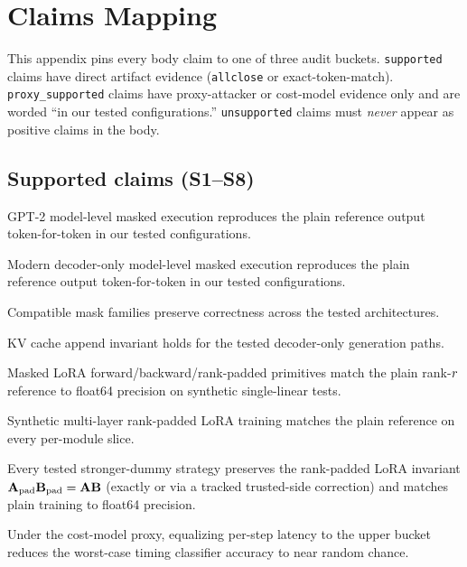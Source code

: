 \section{Claims Mapping}
\label{app:claims}

This appendix pins every body claim to one of three audit buckets. \texttt{supported} claims have direct artifact evidence (\texttt{allclose} or exact-token-match). \texttt{proxy\_supported} claims have proxy-attacker or cost-model evidence only and are worded ``in our tested configurations.'' \texttt{unsupported} claims must \emph{never} appear as positive claims in the body.

\subsection*{Supported claims (S1--S8)}
\begin{description}[leftmargin=*, style=unboxed]
  \item[S1] GPT-2 model-level masked execution reproduces the plain reference output token-for-token in our tested configurations.
  \item[S2] Modern decoder-only model-level masked execution reproduces the plain reference output token-for-token in our tested configurations.
  \item[S3] Compatible mask families preserve correctness across the tested architectures.
  \item[S4] KV cache append invariant holds for the tested decoder-only generation paths.
  \item[S5] Masked LoRA forward/backward/rank-padded primitives match the plain rank-$r$ reference to float64 precision on synthetic single-linear tests.
  \item[S6] Synthetic multi-layer rank-padded LoRA training matches the plain reference on every per-module slice.
  \item[S7] Every tested stronger-dummy strategy preserves the rank-padded LoRA invariant $\mathbf{A}_{\mathrm{pad}}\mathbf{B}_{\mathrm{pad}} = \mathbf{A}\mathbf{B}$ (exactly or via a tracked trusted-side correction) and matches plain training to float64 precision.
  \item[S8] Under the cost-model proxy, equalizing per-step latency to the upper bucket reduces the worst-case timing classifier accuracy to near random chance.
\end{description}


